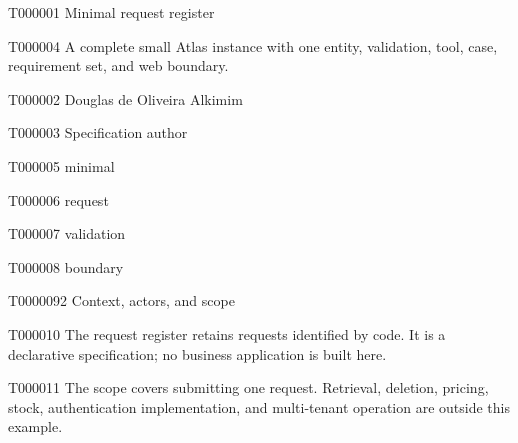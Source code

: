 \documentclass[11pt,a4paper]{article}
\begin{document}
\begin{atlastitle}{T000001}
Minimal request register
\end{atlastitle}
\begin{atlastext}{T000004}
A complete small Atlas instance with one entity, validation, tool, case, requirement set, and web boundary.
\end{atlastext}
\AtlasEndCover
{}
\begin{atlasitem}{T000002}
Douglas de Oliveira Alkimim
\end{atlasitem}
\begin{atlastext}{T000003}
Specification author
\end{atlastext}
\begin{atlasitem}{T000005}
minimal
\end{atlasitem}
\begin{atlasitem}{T000006}
request
\end{atlasitem}
\begin{atlasitem}{T000007}
validation
\end{atlasitem}
\begin{atlasitem}{T000008}
boundary
\end{atlasitem}
\begin{atlasheading}{T000009}{2}
Context, actors, and scope
\end{atlasheading}
\begin{atlasparagraph}{T000010}
The request register retains requests identified by code. It is a declarative specification; no business application is built here.
\end{atlasparagraph}
\begin{atlasparagraph}{T000011}
The scope covers submitting one request. Retrieval, deletion, pricing, stock, authentication implementation, and multi-tenant operation are outside this example.
\end{atlasparagraph}
\end{document}
